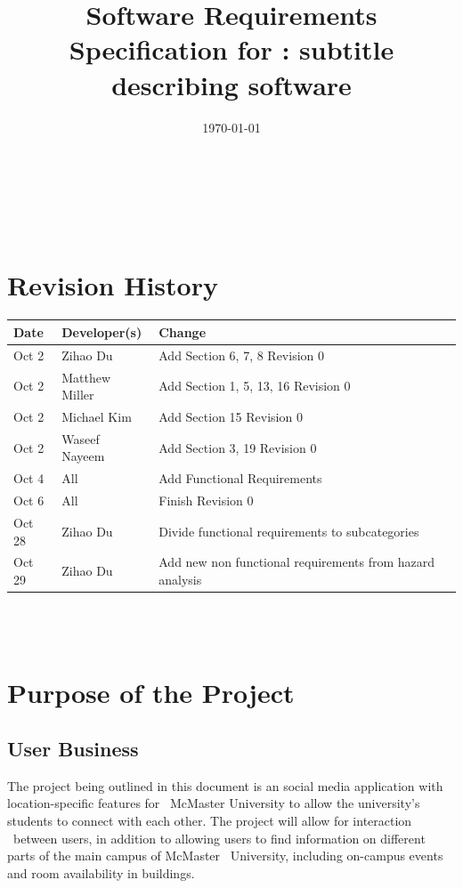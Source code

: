 \documentclass[12pt]{article}
\begin{document}

\title{Software Requirements Specification for \progname: subtitle describing software} 
\author{\authname}
\date{\today}
	
\maketitle

~\newpage


\tableofcontents

~\newpage

\section*{Revision History}

\begin{tabularx}{\textwidth}{p{3cm}p{3cm}X}
\toprule {\textbf{Date}} & {\textbf{Developer(s)}} & {\textbf{Change}}\\
\midrule
Oct 2 & Zihao Du & Add Section 6, 7, 8 Revision 0\\
Oct 2 & Matthew Miller & Add Section 1, 5, 13, 16 Revision 0\\
Oct 2 & Michael Kim & Add Section 15 Revision 0\\
Oct 2 & Waseef Nayeem & Add Section 3, 19 Revision 0\\
Oct 4 & All & Add Functional Requirements\\
Oct 6 & All & Finish Revision 0\\
Oct 28 & Zihao Du & Divide functional requirements to subcategories\\
Oct 29 & Zihao Du & Add new non functional requirements from hazard analysis\\
\bottomrule
\end{tabularx}

~\\

~\newpage
\section{Purpose of the Project}
\subsection{User Business}
\quad The project being outlined in this document is an social media application with location-specific features for \
McMaster University to allow the university's students to connect with each other. The project will allow for interaction \
between users, in addition to allowing users to find information on different parts of the main campus of McMaster \
University, including on-campus events and room availability in buildings.
\end{document}
